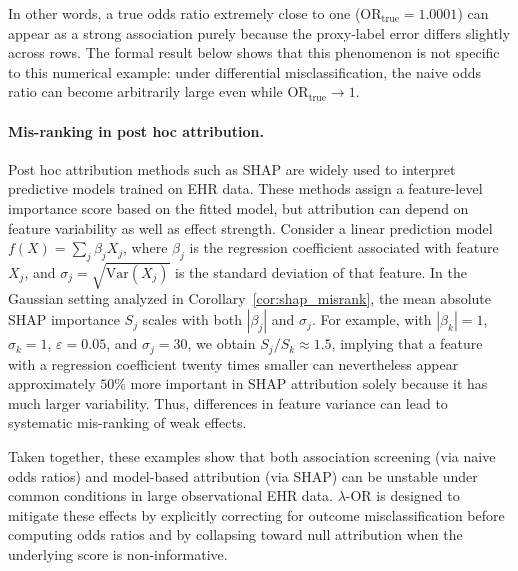 \documentclass[pdflatex,sn-mathphys-num]{sn-jnl}%
\newcommand{\SPOR}{\textrm{$\lambda$-OR}}
\theoremstyle{thmstyleone}%
\theoremstyle{thmstyletwo}%
\theoremstyle{thmstylethree}%
\begin{document}
In other words, a true odds ratio extremely close to one
(\(\mathrm{OR}_{\mathrm{true}}=1.0001\))
can appear as a strong association purely because the proxy-label error differs slightly across rows. The formal result below shows that this phenomenon is not specific to this numerical example: under differential misclassification, the naive odds ratio can become arbitrarily large even while \(\mathrm{OR}_{\mathrm{true}}\to 1\).

\paragraph{Mis-ranking in post hoc attribution.}
Post hoc attribution methods such as SHAP are widely used to interpret predictive models trained on EHR data. These methods assign a feature-level importance score based on the fitted model, but attribution can depend on feature variability as well as effect strength. Consider a linear prediction model $ f(X)=\sum_{j}\beta_j X_j$, 
where $\beta_j$ is the regression coefficient associated with feature $X_j$, and $\sigma_j=\sqrt{\mathrm{Var}(X_j)}$ is the standard deviation of that feature. In the Gaussian setting analyzed in Corollary~\ref{cor:shap_misrank}, the mean absolute SHAP importance $S_j$ scales with both $|\beta_j|$ and $\sigma_j$. For example, with $|\beta_k|=1$, $\sigma_k=1$, $\varepsilon=0.05$, and $\sigma_j=30$, we obtain $S_j/S_k\approx 1.5$, implying that a feature with a regression coefficient twenty times smaller can nevertheless appear approximately $50\%$ more important in SHAP attribution solely because it has much larger variability. Thus, differences in feature variance can  lead to systematic mis-ranking of weak effects.

Taken together, these examples show that both association screening (via naive odds ratios) and model-based attribution (via SHAP) can be unstable under common conditions in large observational EHR data. $\SPOR$ is designed to mitigate these effects by explicitly correcting for outcome misclassification before computing odds ratios and by collapsing toward null attribution when the underlying score is non-informative.
\end{document}
